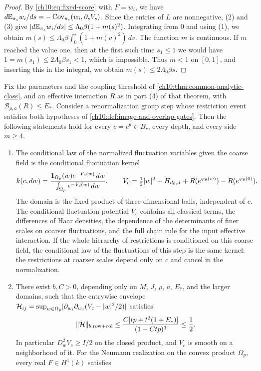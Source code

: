 \begin{proof}
By \eqref{ch10:eq:fixed-score} with $F=w_i$, we have $d\mathbb E_{\pi_s}w_i/ds=-\operatorname{Cov}_{\pi_s}(w_i,\partial_sV_s)$. Since the entries of $L$ are nonnegative, (2) and (3) give $\lvert d\mathbb E_{\pi_s}w_i/ds\rvert\le\Lambda_0\beta(1+m(s)^2)$. Integrating from $0$ and using (1), we obtain $m(s)\le\Lambda_0\beta\int_0^s(1+m(v)^2)\,dv$. The function $m$ is continuous. If $m$ reached the value one, then at the first such time $s_1\le1$ we would have $1=m(s_1)\le2\Lambda_0\beta s_1<1$, which is impossible. Thus $m<1$ on $[0,1]$, and inserting this in the integral, we obtain $m(s)\le2\Lambda_0\beta s$.
\end{proof}

\begin{theorem}\label{ch10:thm:complete-white-law}
Fix the parameters and the coupling threshold of \cref{ch10:thm:common-analytic-class}, and an effective interaction $R$ as in part (4) of that theorem, with $\mathcal B_{\rho,a}(R)\le E_*$. Consider a renormalization group step whose restriction event satisfies both hypotheses of \cref{ch10:def:image-and-overlap-gates}. Then the following statements hold for every $c=e^\theta\in B_r$, every depth, and every side $m\ge4$.
\begin{enumerate}
\item The conditional law of the normalized fluctuation variables given the coarse field is the conditional fluctuation kernel
\[
 k(c,dw)=\frac{\mathbf 1_{\Omega_p}(w)e^{-V_c(w)}\,dw}{\int_{\Omega_p}e^{-V_c(w)}\,dw},\qquad
 V_c=\tfrac12\lvert w\rvert^2+H_{d_0,J}+R(e^{\varphi_\theta(w)})-R(e^{\varphi_\theta(0)}).
\]
The domain is the fixed product of three-dimensional balls, independent of $c$. The conditional fluctuation potential $V_c$ contains all classical terms, the differences of Haar densities, the dependence of the determinants of finer scales on coarser fluctuations, and the full chain rule for the input effective interaction. If the whole hierarchy of restrictions is conditioned on this coarse field, the conditional law of the fluctuations of this step is the same kernel: the restrictions at coarser scales depend only on $c$ and cancel in the normalization.
\item There exist $b,C>0$, depending only on $M$, $J$, $\rho$, $a$, $E_*$, and the larger domains, such that the entrywise envelope $\mathcal H_{ij}=\sup_{w\in\Omega_p}\lvert \partial_{w_i}\partial_{w_j}(V_c-\lvert w\rvert^2/2)\rvert$ satisfies
\[
 \lVert \mathcal H\rVert_{b,\mathrm{row+col}}\le\frac{C[tp+t^2(1+E_*)]}{(1-Ctp)^3}\le\frac12.
\]
In particular $D_w^2V_c\ge I/2$ on the closed product, and $V_c$ is smooth on a neighborhood of it. For the Neumann realization on the convex product $\Omega_p$, every real $F\in H^1(k)$ satisfies

\end{enumerate}
\end{theorem}
